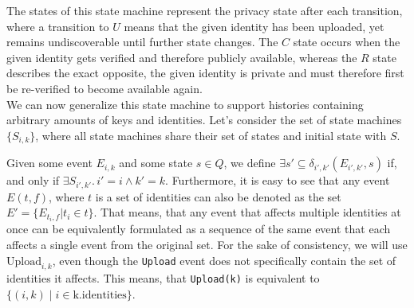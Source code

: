 The states of this state machine represent the privacy state after each transition, where a transition to \(U\) means that the given identity has been uploaded, yet remains undiscoverable until further state changes. The \(C\) state occurs when the given identity gets verified and therefore publicly available, whereas the \(R\) state describes the exact opposite, the given identity is private and must therefore first be re-verified to become available again.
\\

We can now generalize this state machine to support histories containing arbitrary amounts of keys and identities. Let's consider the set of state machines \(\{S_{i,k}\}\), where all state machines share their set of states and initial state with \(S\). 

Given some event \(E_{i,k}\) and some state \(s \in Q\), we define \( \exists {s'} \subseteq \delta_{i',k'}(E_{i',k'},s) \) if, and only if \( \exists S_{i',k'} .\, i' = i \wedge k' = k\).
Furthermore, it is easy to see that any event \(E(t,f)\), where \(t\) is a set of identities can also be denoted as the set \(E' = \{E_{t_i,f} | t_i \in t\} \). That means, that any event that affects multiple identities at once can be equivalently formulated as a sequence of the same event that each affects a single event from the original set.
For the sake of consistency, we will use \(\text{Upload}_{i,k}\), even though the \texttt{Upload} event does not specifically contain the set of identities it affects. This means, that \texttt{Upload(k)} is equivalent to \(\{(i,k) \; \big|\; i \in \text{k.identities}\}\).

